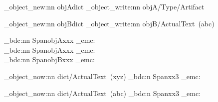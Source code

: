 \documentclass{article}
\begin{document}
\ExplSyntaxOn
\pdf_object_new:nn   {objA}{dict}
\pdf_object_write:nn {objA}{/Type/Artifact}

\pdf_object_new:nn   {objB}{dict}
\pdf_object_write:nn {objB}{/ActualText~(abc)}

\vspace*{44\baselineskip}
\pdf_bdc:nn {Span}{objA}xxx
\pdf_emc:
\\
\pdf_bdc:nn {Span}{objA}xxx
\pdf_emc:
\\
\pdf_bdc:nn {Span}{objB}xxx
\pdf_emc:

\pdf_object_now:nn {dict}{/ActualText~(xyz)}
\pdf_bdc:n {Span}xx3
\pdf_emc:

\pdf_object_now:nn {dict}{/ActualText~(abc)}
\pdf_bdc:n {Span}xx3
\pdf_emc:
\ExplSyntaxOff
\end{document}

